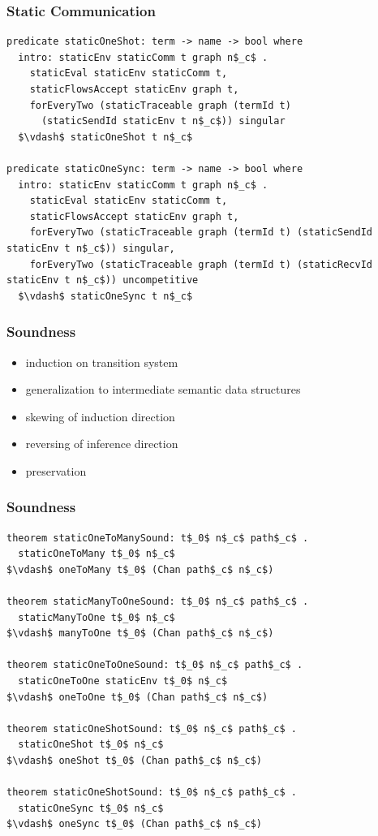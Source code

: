 \documentclass{beamer}
\begin{document}
\begin{frame}[fragile]
	\frametitle{Static Communication}
\begin{lstlisting}[language=logic, mathescape]
predicate staticOneShot: term -> name -> bool where
  intro: staticEnv staticComm t graph n$_c$ .
    staticEval staticEnv staticComm t,
    staticFlowsAccept staticEnv graph t,
    forEveryTwo (staticTraceable graph (termId t)
      (staticSendId staticEnv t n$_c$)) singular
  $\vdash$ staticOneShot t n$_c$

predicate staticOneSync: term -> name -> bool where
  intro: staticEnv staticComm t graph n$_c$ .
    staticEval staticEnv staticComm t,
    staticFlowsAccept staticEnv graph t,
    forEveryTwo (staticTraceable graph (termId t) (staticSendId staticEnv t n$_c$)) singular,
    forEveryTwo (staticTraceable graph (termId t) (staticRecvId staticEnv t n$_c$)) uncompetitive
  $\vdash$ staticOneSync t n$_c$
\end{lstlisting}
\end{frame}


\begin{frame}
\frametitle{Soundness}
\begin{itemize}
\item induction on transition system 
\item generalization to intermediate semantic data structures 
\item skewing of induction direction
\item reversing of inference direction  
\item preservation
\end{itemize}
\end{frame}


\begin{frame}[fragile]
	\frametitle{Soundness}
\begin{lstlisting}[language=logic, mathescape]
theorem staticOneToManySound: t$_0$ n$_c$ path$_c$ . 
  staticOneToMany t$_0$ n$_c$
$\vdash$ oneToMany t$_0$ (Chan path$_c$ n$_c$)

theorem staticManyToOneSound: t$_0$ n$_c$ path$_c$ . 
  staticManyToOne t$_0$ n$_c$
$\vdash$ manyToOne t$_0$ (Chan path$_c$ n$_c$)

theorem staticOneToOneSound: t$_0$ n$_c$ path$_c$ . 
  staticOneToOne staticEnv t$_0$ n$_c$
$\vdash$ oneToOne t$_0$ (Chan path$_c$ n$_c$)

theorem staticOneShotSound: t$_0$ n$_c$ path$_c$ .
  staticOneShot t$_0$ n$_c$
$\vdash$ oneShot t$_0$ (Chan path$_c$ n$_c$)

theorem staticOneShotSound: t$_0$ n$_c$ path$_c$ .
  staticOneSync t$_0$ n$_c$
$\vdash$ oneSync t$_0$ (Chan path$_c$ n$_c$)
\end{lstlisting}
\end{frame}
\end{document}
